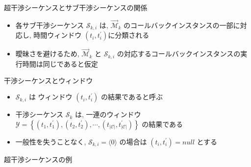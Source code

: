 \begin{frame}{超干渉シーケンスとサブ干渉シーケンスの関係}
    \begin{itemize}
        \item 各サブ干渉シーケンス $\mathcal{S}_{k, i}$ は, $\overrightarrow{\mathcal{M}}_{k}$ のコールバックインスタンスの一部に対応し, 時間ウィンドウ $\left(t_{i}, t_{i}^{\prime}\right)$に分類される
        \item 曖昧さを避けるため, $\overrightarrow{\mathcal{M}}_{k}$ と $\mathcal{S}_{k, i}$ の対応するコールバックインスタンスの実行時間は同じであると仮定
    \end{itemize}
\end{frame}

\begin{frame}{干渉シーケンスとウィンドウ}
    \begin{itemize}
        \item $\mathcal{S}_{k, i}$ は ウィンドウ $\left(t_{i}, t_{i}^{\prime}\right)$ の結果であると呼ぶ
        \item 干渉シーケンス $\mathcal{S}_{k}$ は, 一連のウィンドウ $\mathcal{Y}=\left\{\left(t_{1}, t_{1}^{\prime}\right),\left(t_{2}, t_{2}^{\prime}\right), \cdots,\left(t_{|\mathcal{C}|}, t_{|\mathcal{C}|}^{\prime}\right)\right\}$ の結果である
        \item 一般性を失うことなく, $\mathcal{S}_{k, i}=\langle 0\rangle$ の場合は $\left(t_{i}, t_{i}^{\prime}\right)=n u l l$ とする
    \end{itemize}
\end{frame}

\begin{frame}{超干渉シーケンスの例}
\end{frame}

